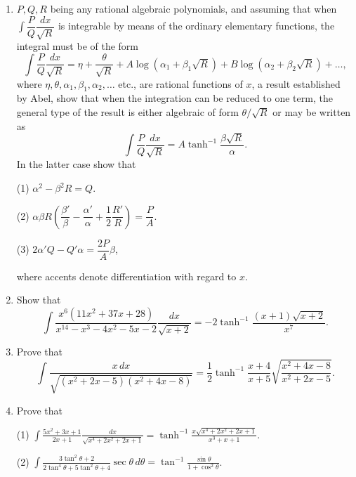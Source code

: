 \documentclass[11pt, a4paper]{article}
\newcommand{\source}[1]{\hfill\textnormal{[#1]}}
\begin{document}
\begin{enumerate}[leftmargin=2em]
(2) That $MT=T\dfrac{d\theta}{dx}-\dfrac1m\theta\dfrac{dT}{dx}$.

(3) That $\theta$ is an integral polynomial expression and not of such form as $\dfrac{U}{V}$, where $U$ and $V$ are complete polynomials, i.e. not such that $V$ contains $x$.

(4) That the degree of the polynomial $\theta$ is greater by unity than the degree of $M$.

Use these facts to show that $\displaystyle\int\dfrac{x^2\,dx}{\sqrt{1+x^4}}$ is not expressible algebraically. \source{Bertrand, C. I., p. 94.}

\item $P, Q, R$ being any rational algebraic polynomials, and assuming that when $\displaystyle\int\dfrac{P}{Q}\dfrac{dx}{\sqrt R}$ is integrable by means of the ordinary elementary functions, the integral must be of the form
\[
\int\frac{P}{Q}\frac{dx}{\sqrt R}=\eta+\frac{\theta}{\sqrt R}+A\log(\alpha_1+\beta_1\sqrt R)+B\log(\alpha_2+\beta_2\sqrt R)+\dots,
\]
where $\eta,\theta,\alpha_1,\beta_1,\alpha_2,\dots$ etc., are rational functions of $x$, a result established by Abel, show that when the integration can be reduced to one term, the general type of the result is either algebraic of form $\theta/\sqrt R$ or may be written as
\[
\int\frac{P}{Q}\frac{dx}{\sqrt R}=A\tanh^{-1}\frac{\beta\sqrt R}{\alpha}.
\]
In the latter case show that

(1) $\alpha^2-\beta^2R=Q$.

(2) $\alpha\beta R\left(\dfrac{\beta'}{\beta}-\dfrac{\alpha'}{\alpha}+\dfrac12\dfrac{R'}{R}\right)=\dfrac{P}{A}$.

(3) $2\alpha'Q-Q'\alpha=\dfrac{2P}{A}\beta$,

where accents denote differentiation with regard to $x$.

\item Show that
\[
\int\frac{x^6(11x^2+37x+28)}{x^{14}-x^3-4x^2-5x-2}\frac{dx}{\sqrt{x+2}}=-2\tanh^{-1}\frac{(x+1)\sqrt{x+2}}{x^7}.
\]

\item Prove that
\[
\int\frac{x\,dx}{\sqrt{(x^2+2x-5)(x^2+4x-8)}}=\frac12\tanh^{-1}\frac{x+4}{x+5}\sqrt{\frac{x^2+4x-8}{x^2+2x-5}}.
\]

\item Prove that

(1) $\displaystyle\int\frac{5x^2+3x+1}{2x+1}\frac{dx}{\sqrt{x^4+2x^2+2x+1}}=\tanh^{-1}\frac{x\sqrt{x^4+2x^2+2x+1}}{x^3+x+1}$.

(2) $\displaystyle\int\frac{3\tan^2\theta+2}{2\tan^4\theta+5\tan^2\theta+4}\sec\theta\,d\theta=\tan^{-1}\frac{\sin\theta}{1+\cos^2\theta}$.


\end{enumerate}
\end{document}
